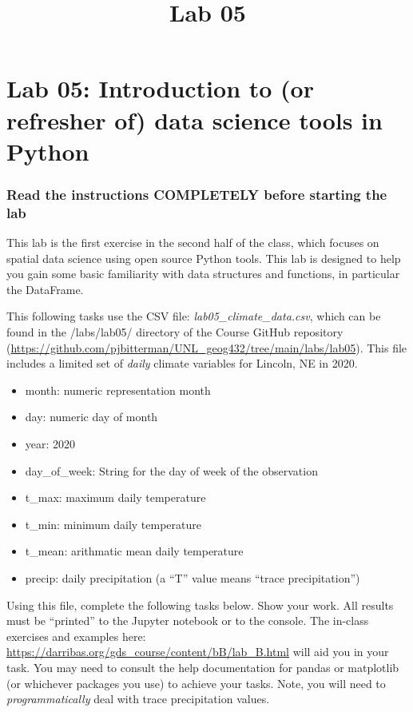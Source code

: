 \documentclass[]{article}
\title{Lab 05}
\author{}
\date{}
\makeatletter
\providecommand{\tightlist}{%
  \setlength{\itemsep}{0pt}\setlength{\parskip}{0pt}}
\renewcommand{\maketitle}{\bgroup\vspace*{-1cm}\setlength{\parindent}{0pt}
\begin{flushleft}
  \@author
  
  \@date
  
\end{flushleft}\egroup
}
\makeatother
\begin{document}
\maketitle

\hypertarget{lab-05-introduction-to-or-refresher-of-data-science-tools-in-python}{%
\section{Lab 05: Introduction to (or refresher of) data science tools in
Python}\label{lab-05-introduction-to-or-refresher-of-data-science-tools-in-python}}

\hypertarget{read-the-instructions-completely-before-starting-the-lab}{%
\subsubsection{Read the instructions COMPLETELY before starting the
lab}\label{read-the-instructions-completely-before-starting-the-lab}}

This lab is the first exercise in the second half of the class, which
focuses on spatial data science using open source Python tools. This lab
is designed to help you gain some basic familiarity with data structures
and functions, in particular the DataFrame.

This following tasks use the CSV file: \emph{lab05\_climate\_data.csv},
which can be found in the /labs/lab05/ directory of the Course GitHub
repository
(\url{https://github.com/pjbitterman/UNL_geog432/tree/main/labs/lab05}).
This file includes a limited set of \emph{daily} climate variables for
Lincoln, NE in 2020.

\begin{itemize}
\tightlist
\item
  month: numeric representation month
\item
  day: numeric day of month
\item
  year: 2020
\item
  day\_of\_week: String for the day of week of the observation
\item
  t\_max: maximum daily temperature
\item
  t\_min: minimum daily temperature
\item
  t\_mean: arithmatic mean daily temperature
\item
  precip: daily precipitation (a ``T'' value means ``trace
  precipitation'')
\end{itemize}

Using this file, complete the following tasks below. Show your work. All
results must be ``printed'' to the Jupyter notebook or to the console.
The in-class exercises and examples here:
\url{https://darribas.org/gds_course/content/bB/lab_B.html} will aid you
in your task. You may need to consult the help documentation for pandas
or matplotlib (or whichever packages you use) to achieve your tasks.
Note, you will need to \emph{programmatically} deal with trace
precipitation values.
\end{document}
